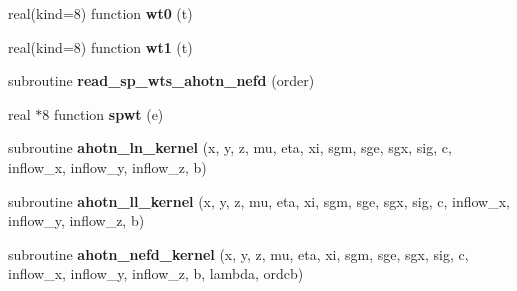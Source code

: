\begin{DoxyCompactItemize}
\item 
\hypertarget{classkernel__module_aa7132726727d08e3e2637052f59abdad}{real(kind=8) function {\bfseries wt0} (t)}\label{classkernel__module_aa7132726727d08e3e2637052f59abdad}

\item 
\hypertarget{classkernel__module_a2167a318581a58f1b295119931ddd408}{real(kind=8) function {\bfseries wt1} (t)}\label{classkernel__module_a2167a318581a58f1b295119931ddd408}

\item 
\hypertarget{classkernel__module_a4074268fc2e0b2ba21b5ad39eec86ab3}{subroutine {\bfseries read\+\_\+sp\+\_\+wts\+\_\+ahotn\+\_\+nefd} (order)}\label{classkernel__module_a4074268fc2e0b2ba21b5ad39eec86ab3}

\item 
\hypertarget{classkernel__module_a6c7125e68f81cb0e7cd9f3e48abc126e}{real $\ast$8 function {\bfseries spwt} (e)}\label{classkernel__module_a6c7125e68f81cb0e7cd9f3e48abc126e}

\item 
\hypertarget{classkernel__module_a3d3eccec75c0ba28bb09ab8ca22818bc}{subroutine {\bfseries ahotn\+\_\+ln\+\_\+kernel} (x, y, z, mu, eta, xi, sgm, sge, sgx, sig, c, inflow\+\_\+x, inflow\+\_\+y, inflow\+\_\+z, b)}\label{classkernel__module_a3d3eccec75c0ba28bb09ab8ca22818bc}

\item 
\hypertarget{classkernel__module_a98095dff722fb7046e5b08932b02149d}{subroutine {\bfseries ahotn\+\_\+ll\+\_\+kernel} (x, y, z, mu, eta, xi, sgm, sge, sgx, sig, c, inflow\+\_\+x, inflow\+\_\+y, inflow\+\_\+z, b)}\label{classkernel__module_a98095dff722fb7046e5b08932b02149d}

\item 
\hypertarget{classkernel__module_aa6341d47b5386becb826bdbb16be5e89}{subroutine {\bfseries ahotn\+\_\+nefd\+\_\+kernel} (x, y, z, mu, eta, xi, sgm, sge, sgx, sig, c, inflow\+\_\+x, inflow\+\_\+y, inflow\+\_\+z, b, lambda, ordcb)}\label{classkernel__module_aa6341d47b5386becb826bdbb16be5e89}

\end{DoxyCompactItemize}
